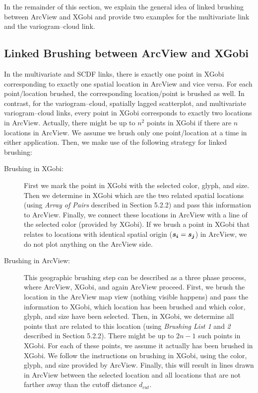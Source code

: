 In the remainder of this section, we explain the general
idea of linked brushing between ArcView and XGobi and
provide two examples for the
multivariate link and the variogram--cloud link.


\subsection{Linked Brushing between ArcView and XGobi}

In the multivariate and SCDF links, there is exactly one point in XGobi
corresponding to exactly one spatial location in ArcView 
and vice versa. For each point/location brushed, 
the corresponding location/point is brushed
as well.  In contrast, for the variogram--cloud, spatially lagged
scatterplot, and multivariate variogram--cloud links, every point in
XGobi corresponds to exactly two locations in ArcView. Actually, there
might be up to $n^2$ points in XGobi if there are $n$ locations in
ArcView.  We assume we brush only one point/location at a time in either
application.  Then, we make use of the following strategy for linked
brushing:

\begin{description}
\item[Brushing in XGobi:] First we mark the point in XGobi with the 
selected color, glyph, and size. Then we determine in XGobi which
are the two related spatial locations (using {\it Array of Pairs}
described in Section 5.2.2)
and pass this information to ArcView. Finally, we 
connect these locations in ArcView with a line of the
selected color (provided by XGobi). If we brush a point in XGobi
that relates to locations with identical spatial origin
($\mbox{\boldmath$s_i$} = \mbox{\boldmath$s_j$}$) in ArcView,
we do not plot anything on the ArcView side. 

\item[Brushing in ArcView:] This geographic brushing step
can be described as a three phase
process, where ArcView, XGobi, and again ArcView proceed. 
First, we brush the location in the ArcView map view (nothing visible
happens) and pass the information to XGobi, which location has been brushed
and which color, glyph, and size have been selected.
Then, in XGobi, we determine all points that are related
to this location (using {\it Brushing List 1} and {\it 2} 
described in Section 5.2.2).
There might be up to $2 n - 1$ such points in XGobi. For each
of these points, we assume it actually has been brushed in XGobi.
We follow the instructions on brushing in XGobi, using the color,
glyph, and size provided by ArcView. Finally, this will 
result in lines drawn in ArcView  between the selected location and all
locations that are not farther away than the cutoff distance $d_{cut}$.
\end{description}

